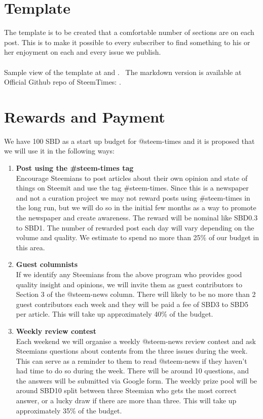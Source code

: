 \documentclass[a4paper,12pt]{article}
\newcommand{\lnk}[3][blue]{\href{#2}{\color{#1}{#3}}}%
\newcommand{\sectionbreak}{\clearpage}
\begin{document}
\section {Template}

The template is to be created that a comfortable number of sections are on each post. This is to make it possible to every subscriber to find something to his or her enjoyment on each and every issue we publish. 
\\\\
Sample view of the template at \lnk{https://steemit.com/esteem/@johnsonlai/say-no-more-to-microsoft-word-fe73aa1ca8232}{steemit} and \lnk{https://busy.org/esteem/@johnsonlai/say-no-more-to-microsoft-word-fe73aa1ca8232}{busy.org}. \
The markdown version is available at Official Github repo of SteemTimes: \lnk{https://github.com/superoo7/SteemTimes/blame/master/format.md}{format.md}.

\sectionbreak
\section {Rewards and Payment}


We have 100 SBD as a start up budget for @steem-times and it is proposed that we will use it in the following ways:

\begin{enumerate}
    \item \textbf{Post using the \#steem-times tag}\\Encourage Steemians to post articles about their own opinion and state of things on Steemit and use the tag  \#steem-times.  Since this is a newspaper and not a curation project we may not reward posts using \#steem-times in the long run, but we will do so in the initial few months as a way to promote the newspaper and create awareness.  The reward will be nominal like SBD0.3 to SBD1.  The number of rewarded post each day will vary depending on the volume and quality.  We estimate to spend no more than 25\%  of our budget in this area.
    \item \textbf{Guest columnists}\\If we identify any Steemians from the above program who provides good quality insight and opinions, we will invite them as guest contributors to Section 3 of the @steem-news column.  There will likely to be no more than 2 guest contributors each week and they will be paid a fee of SBD3 to SBD5 per article.  This will take up approximately 40\% of the budget.
    \item \textbf{Weekly review contest}\\Each weekend we will organise a weekly @steem-news review contest and ask Steemians questions about contents from the three issues during the week.  This can serve as a reminder to them to read @steem-news if they haven't had time to do so during the week.  There will be around 10 questions, and the answers will be submitted via Google form.  The weekly prize pool will be around  SBD10 split between three Steemian who gets the most correct answer, or a lucky draw if there are more than three.  This will take up approximately 35\% of the budget.
\end{enumerate}
\end{document}
